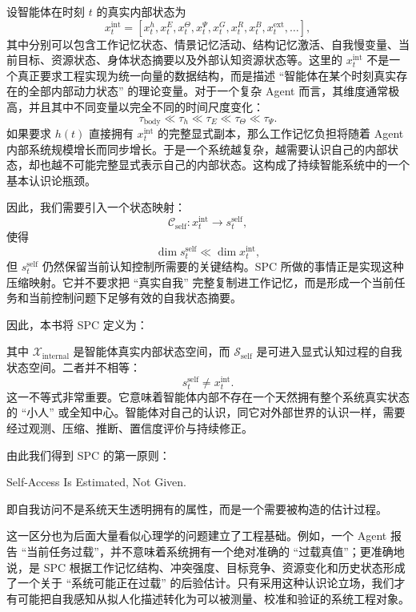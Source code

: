 设智能体在时刻 $t$ 的真实内部状态为
\[
x_t^{\mathrm{int}}
=
\left[
x_t^{h},
x_t^{E},
x_t^{\Theta},
x_t^{\Psi},
x_t^{G},
x_t^{R},
x_t^{B},
x_t^{\mathrm{ext}},
\ldots
\right],
\]
其中分别可以包含工作记忆状态、情景记忆活动、结构记忆激活、自我慢变量、当前目标、资源状态、身体状态摘要以及外部认知资源状态等。这里的 $x_t^{\mathrm{int}}$ 不是一个真正要求工程实现为统一向量的数据结构，而是描述 ``智能体在某个时刻真实存在的全部内部动力状态'' 的理论变量。对于一个复杂 Agent 而言，其维度通常极高，并且其中不同变量以完全不同的时间尺度变化：
\[
\tau_{\mathrm{body}}
\ll
\tau_h
\ll
\tau_E
\ll
\tau_\Theta
\ll
\tau_\Psi .
\]
如果要求 $h(t)$ 直接拥有 $x_t^{\mathrm{int}}$ 的完整显式副本，那么工作记忆负担将随着 Agent 内部系统规模增长而同步增长。于是一个系统越复杂，越需要认识自己的内部状态，却也越不可能完整显式表示自己的内部状态。这构成了持续智能系统中的一个基本认识论瓶颈。

因此，我们需要引入一个状态映射：
\[
\mathcal C_{\mathrm{self}}:
x_t^{\mathrm{int}}
\longrightarrow
s_t^{\mathrm{self}},
\]
使得
\[
\dim s_t^{\mathrm{self}}
\ll
\dim x_t^{\mathrm{int}},
\]
但 $s_t^{\mathrm{self}}$ 仍然保留当前认知控制所需要的关键结构。SPC 所做的事情正是实现这种压缩映射。它并不要求把 ``真实自我'' 完整复制进工作记忆，而是形成一个当前任务和当前控制问题下足够有效的自我状态摘要。

因此，本书将 SPC 定义为：
\begin{statementbox}
\centering
{}
\end{statementbox}
其中 $\mathcal X_{\mathrm{internal}}$ 是智能体真实内部状态空间，而 $\mathcal S_{\mathrm{self}}$ 是可进入显式认知过程的自我状态空间。二者并不相等：
\[
\boxed{
s_t^{\mathrm{self}}
\neq
x_t^{\mathrm{int}}.
}
\]
这一不等式非常重要。它意味着智能体内部不存在一个天然拥有整个系统真实状态的 ``小人'' 或全知中心。智能体对自己的认识，同它对外部世界的认识一样，需要经过观测、压缩、推断、置信度评价与持续修正。

由此我们得到 SPC 的第一原则：
\begin{proposition*}
Self-Access Is Estimated, Not Given.
\end{proposition*}
即自我访问不是系统天生透明拥有的属性，而是一个需要被构造的估计过程。

这一区分也为后面大量看似心理学的问题建立了工程基础。例如，一个 Agent 报告 ``当前任务过载''，并不意味着系统拥有一个绝对准确的 ``过载真值''；更准确地说，是 SPC 根据工作记忆结构、冲突强度、目标竞争、资源变化和历史状态形成了一个关于 ``系统可能正在过载'' 的后验估计。只有采用这种认识论立场，我们才有可能把自我感知从拟人化描述转化为可以被测量、校准和验证的系统工程对象。

